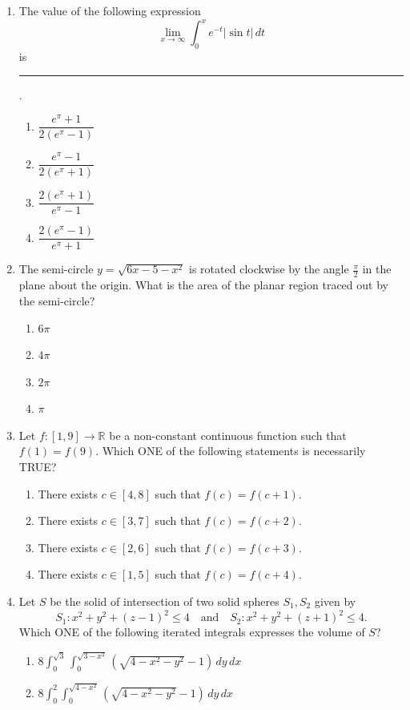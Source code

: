 \begin{enumerate}
\begin{enumerate}[label=(\Alph*)]
\item $\frac12$
\item $\dfrac1{\sqrt2}$
\end{enumerate}
\item The value of the following expression
\[\lim_{x\to\infty}\int_0^x e^{-t}|\sin t|\,dt\]
is \rule{2cm}{0.4pt}.
\begin{enumerate}[label=(\Alph*)]
\item $\dfrac{e^\pi+1}{2(e^\pi-1)}$
\item $\dfrac{e^\pi-1}{2(e^\pi+1)}$
\item $\dfrac{2(e^\pi+1)}{e^\pi-1}$
\item $\dfrac{2(e^\pi-1)}{e^\pi+1}$
\end{enumerate}
\item The semi-circle $y=\sqrt{6x-5-x^2}$ is rotated clockwise by the angle $\frac\pi2$ in the plane about the origin. What is the area of the planar region traced out by the semi-circle?
\begin{enumerate}[label=(\Alph*)]
\item $6\pi$
\item $4\pi$
\item $2\pi$
\item $\pi$
\end{enumerate}
\item Let $f:[1,9]\to\mathbb R$ be a non-constant continuous function such that $f(1)=f(9)$. Which ONE of the following statements is necessarily TRUE?
\begin{enumerate}[label=(\Alph*)]
\item There exists $c\in[4,8]$ such that $f(c)=f(c+1)$.
\item There exists $c\in[3,7]$ such that $f(c)=f(c+2)$.
\item There exists $c\in[2,6]$ such that $f(c)=f(c+3)$.
\item There exists $c\in[1,5]$ such that $f(c)=f(c+4)$.
\end{enumerate}
\item Let $S$ be the solid of intersection of two solid spheres $S_1,S_2$ given by
\[S_1:x^2+y^2+(z-1)^2\le4 \quad\text{and}\quad S_2:x^2+y^2+(z+1)^2\le4.\]
Which ONE of the following iterated integrals expresses the volume of $S$?
\begin{enumerate}[label=(\Alph*)]
\item $\displaystyle 8\int_0^{\sqrt3}\int_0^{\sqrt{3-x^2}}(\sqrt{4-x^2-y^2}-1)\,dy\,dx$
\item $\displaystyle 8\int_0^2\int_0^{\sqrt{4-x^2}}(\sqrt{4-x^2-y^2}-1)\,dy\,dx$

\end{enumerate}
\end{enumerate}
